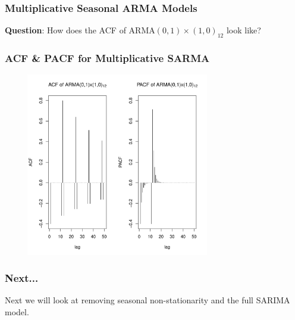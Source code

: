 \documentclass[%
xcolor=pdftex]{beamer}
\begin{document}
\begin{frame}
\frametitle{Multiplicative Seasonal ARMA Models}

\textbf{Question}: How does the ACF of ARMA$(0,1) \times (1,0)_{12}$ look like?

\vspace{50mm}

\end{frame}

\begin{frame}
\frametitle{ACF \& PACF for Multiplicative SARMA}

\includegraphics[width=100mm, height=80mm]{arma_acf.pdf}

\end{frame}


\begin{frame}
\frametitle{Next...}

Next we will look at removing seasonal non-stationarity and the full SARIMA model.

\end{frame}
\end{document}
